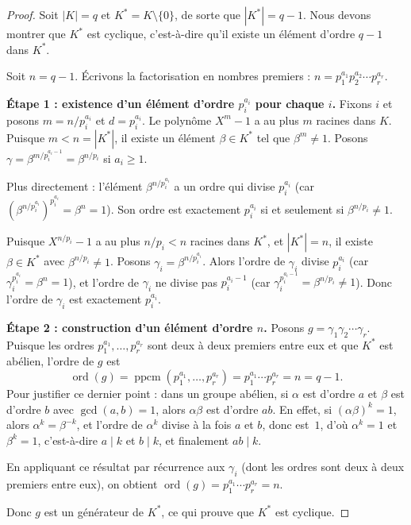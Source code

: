 \documentclass[12pt,a4paper,openany]{book}
\theoremstyle{definition}
\begin{document}
\begin{proof}
Soit $|K| = q$ et $K^* = K \setminus \{0\}$, de sorte que $|K^*| = q-1$. Nous
devons montrer que $K^*$ est cyclique, c'est-à-dire qu'il existe un élément
d'ordre $q - 1$ dans $K^*$.

Soit $n = q - 1$. Écrivons la factorisation en nombres premiers :
$n = p_1^{a_1} p_2^{a_2} \cdots p_r^{a_r}$.

\textbf{Étape 1 : existence d'un élément d'ordre $p_i^{a_i}$ pour chaque $i$.}
Fixons $i$ et posons $m = n / p_i^{a_i}$ et $d = p_i^{a_i}$. Le polynôme
$X^m - 1$ a au plus $m$ racines dans $K$. Puisque $m < n = |K^*|$, il existe un
élément $\beta \in K^*$ tel que $\beta^m \neq 1$. Posons
$\gamma = \beta^{m / p_i^{a_i - 1}} = \beta^{n / p_i}$ si $a_i \geq 1$.

Plus directement : l'élément $\beta^{n/p_i^{a_i}}$ a un ordre qui divise
$p_i^{a_i}$ (car $(\beta^{n/p_i^{a_i}})^{p_i^{a_i}} = \beta^n = 1$). Son ordre
est exactement $p_i^{a_i}$ si et seulement si $\beta^{n/p_i} \neq 1$.

Puisque $X^{n/p_i} - 1$ a au plus $n/p_i < n$ racines dans $K^*$, et
$|K^*| = n$, il existe $\beta \in K^*$ avec $\beta^{n/p_i} \neq 1$. Posons
$\gamma_i = \beta^{n / p_i^{a_i}}$. Alors l'ordre de $\gamma_i$ divise
$p_i^{a_i}$ (car $\gamma_i^{p_i^{a_i}} = \beta^n = 1$), et l'ordre de
$\gamma_i$ ne divise pas $p_i^{a_i - 1}$ (car
$\gamma_i^{p_i^{a_i - 1}} = \beta^{n/p_i} \neq 1$). Donc l'ordre de
$\gamma_i$ est exactement $p_i^{a_i}$.

\textbf{Étape 2 : construction d'un élément d'ordre $n$.}
Posons $g = \gamma_1 \gamma_2 \cdots \gamma_r$. Puisque les ordres
$p_1^{a_1}, \dots, p_r^{a_r}$ sont deux à deux premiers entre eux et que
$K^*$ est abélien, l'ordre de $g$ est
\[
  \operatorname{ord}(g) = \operatorname{ppcm}(p_1^{a_1}, \dots, p_r^{a_r}) =
  p_1^{a_1} \cdots p_r^{a_r} = n = q - 1.
\]
Pour justifier ce dernier point : dans un groupe abélien, si $\alpha$ est
d'ordre $a$ et $\beta$ est d'ordre $b$ avec $\gcd(a,b) = 1$, alors
$\alpha\beta$ est d'ordre $ab$. En effet, si $(\alpha\beta)^k = 1$, alors
$\alpha^k = \beta^{-k}$, et l'ordre de $\alpha^k$ divise à la fois $a$ et $b$,
donc est~$1$, d'où $\alpha^k = 1$ et $\beta^k = 1$, c'est-à-dire $a \mid k$ et
$b \mid k$, et finalement $ab \mid k$.

En appliquant ce résultat par récurrence aux $\gamma_i$ (dont les ordres sont
deux à deux premiers entre eux), on obtient
$\operatorname{ord}(g) = p_1^{a_1} \cdots p_r^{a_r} = n$.

Donc $g$ est un générateur de $K^*$, ce qui prouve que $K^*$ est cyclique.
\end{proof}
\end{document}
